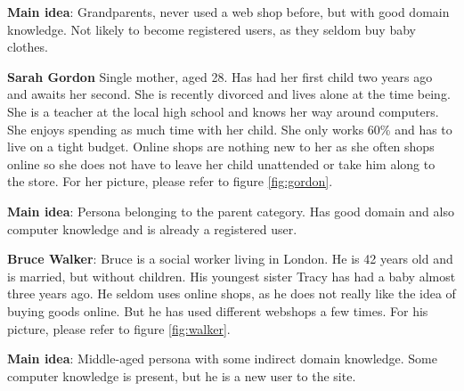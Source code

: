 \textbf{Main idea}:
Grandparents, never used a web shop before, but with good domain knowledge. Not likely to become registered users, as they seldom buy baby clothes.

\textbf{Sarah Gordon}
Single mother, aged 28. Has had her first child two years ago and awaits her second. She is recently divorced and lives alone at the time being.
She is a teacher at the local high school and knows her way around computers. 
She enjoys spending as much time with her child. She only works 60\% and has to live on a tight budget. 
Online shops are nothing new to her as she often shops online so she does not have to leave her child unattended or take him along to the store.
For her picture, please refer to figure \ref{fig:gordon}.	

\textbf{Main idea}:
Persona belonging to the parent category. Has good domain and also computer knowledge and is already a registered user.

\textbf{Bruce Walker}:
Bruce is a social worker living in London. He is 42 years old and is married, but without children.
His youngest sister Tracy has had a baby almost three years ago. 
He seldom uses online shops, as he does not really like the idea of buying goods online. But he has used different webshops a few times. For his picture, please refer to figure \ref{fig:walker}.	

\textbf{Main idea}:
Middle-aged persona with some indirect domain knowledge. Some computer knowledge is present, but he is a new user to the site.


